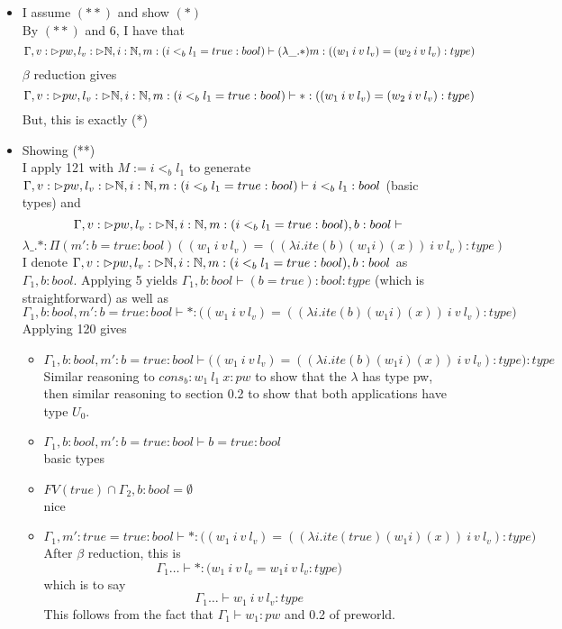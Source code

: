 \message{ !name(paper.tex)}\documentclass{article}
\begin{document}
     \begin{itemize}
         \item I assume $(**)$ and show $(*)$\\
         By $(**)$ and 6, I have that 
         \[\Gamma, v: \rhd pw, l_v: \rhd \mathbb{N}, i: \mathbb{N}, m: (i <_b l_1 = true : bool)  \vdash  (\lambda \_.*) m : ((w_1 \: i \: v \: l_v) = (w_2 \: i \: v \: l_v) : type)
     \]
     $\beta$ reduction gives
       \[\Gamma, v: \rhd pw, l_v: \rhd \mathbb{N}, i: \mathbb{N}, m: (i <_b l_1 = true : bool)  \vdash  * : ((w_1 \: i \: v \: l_v) = (w_2 \: i \: v \: l_v) : type)
     \]
     But, this is exactly (*)
     \item Showing (**)\\
     I apply 121 with $M := i <_b l_1$ to generate\\
     $\Gamma, v: \rhd pw, l_v: \rhd \mathbb{N}, i: \mathbb{N}, m: (i <_b l_1 = true : bool)  \vdash i <_b l_1: bool$ (basic types) and 
   \[\Gamma, v: \rhd pw, l_v: \rhd \mathbb{N}, i: \mathbb{N}, m: (i <_b l_1 = true : bool), b: bool  \vdash \] 
   \[\lambda \_.* : \Pi(m' : b = true : bool)((w_1 \: i \: v \: l_v) = ((\lambda i. ite (b) (w_1 i) (x)) \: i \: v \: l_v) : type)
     \]
     I denote $\Gamma, v: \rhd pw, l_v: \rhd \mathbb{N}, i: \mathbb{N}, m: (i <_b l_1 = true : bool), b: bool$ as $\Gamma_1, b: bool$.
     Applying 5 yields $\Gamma_1, b: bool \vdash (b = true) : bool : type$ (which is straightforward) as well as
     \[\Gamma_1, b: bool, m' : b = true : bool \vdash * : \big((w_1 \: i \: v \: l_v) = ((\lambda i. ite (b) (w_1 i) (x)) \: i \: v \: l_v) : type \big) \] 
         Applying 120 gives 
         \begin{itemize}
             \item $\Gamma_1, b: bool, m' : b = true : bool \vdash 
             \big((w_1 \: i \: v \: l_v) = ((\lambda i. ite (b) (w_1 i) (x)) \: i \: v \: l_v) : type \big) : type
             $\\
             Similar reasoning to $cons_b: w_1 \:l_1\:x : pw$ to show that the $\lambda$ has type pw, then similar reasoning to section 0.2 
             to show that both applications have type $U_0$.
             \item  $\Gamma_1, b: bool, m' : b = true : bool \vdash b = true : bool$\\
             basic types
             \item $FV(true) \cap \Gamma_2, b: bool = \emptyset$\\
             nice
             \item \[\Gamma_1, m' : true = true : bool \vdash 
             * : \big((w_1 \: i \: v \: l_v) = ((\lambda i. ite (true) (w_1 i) (x)) \: i \: v \: l_v) : type \big)
             \]
             After $\beta$ reduction, this is 
             \[\Gamma_1 \dots \vdash 
             * : \big(w_1 \: i \: v \: l_v =  w_1 i \: v \: l_v : type \big)
             \]
             which is to say 
             \[\Gamma_1 \dots \vdash  w_1 \: i \: v \: l_v: type
             \]
             This follows from the fact that $\Gamma_1 \vdash w_1: pw$ and 0.2 of preworld.
         \end{itemize}
     \end{itemize}
     
\end{document}
